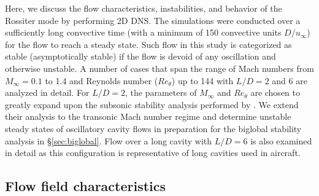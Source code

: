 \documentclass{jfm}
\begin{document}
Here, we discuss the flow characteristics, instabilities, and behavior of the Rossiter mode by performing 2D DNS. The simulations were conducted over a sufficiently long convective time (with a minimum of 150 convective units $D/u_\infty$) for the flow to reach a steady state. Such flow in this study is categorized as stable (asymptotically stable) if the flow is devoid of any oscillation and otherwise unstable. A number of cases that span the range of Mach numbers from $M_\infty = 0.1$ to 1.4 and Reynolds number ($Re_\theta$) up to 144 with $L/D=2$ and 6 are analyzed in detail. For $L/D=2$, the parameters of $M_\infty$ and $Re_\theta$ are chosen to greatly expand upon the subsonic stability analysis performed by \cite{Bres:JFM08}. We extend their analysis to the transonic Mach number regime and determine unstable steady states of oscillatory cavity flows in preparation for the biglobal stability analysis in \S{\ref{sec:biglobal}}. Flow over a long cavity with $L/D=6$ is also examined in detail as this configuration is representative of long cavities used in aircraft.

\subsection{Flow field characteristics}
\label{sec:foc2}
\end{document}
